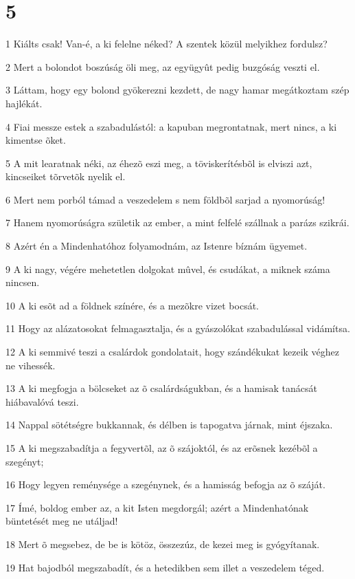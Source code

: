 \chapter{5}

\par 1 Kiálts csak! Van-é, a ki felelne néked? A szentek közül melyikhez fordulsz?
\par 2 Mert a bolondot boszúság öli meg, az együgyût pedig buzgóság veszti el.
\par 3 Láttam, hogy egy bolond gyökerezni kezdett, de nagy hamar megátkoztam szép hajlékát.
\par 4 Fiai messze estek a szabadulástól: a kapuban megrontatnak, mert nincs, a ki kimentse õket.
\par 5 A mit learatnak néki, az éhezõ eszi meg, a töviskerítésbõl is elviszi azt, kincseiket tõrvetõk nyelik el.
\par 6 Mert nem porból támad a veszedelem s nem földbõl sarjad a nyomorúság!
\par 7 Hanem nyomorúságra születik az ember, a mint felfelé szállnak a parázs szikrái.
\par 8 Azért én a Mindenhatóhoz folyamodnám, az Istenre bíznám ügyemet.
\par 9 A ki nagy, végére mehetetlen dolgokat mûvel, és csudákat, a miknek száma nincsen.
\par 10 A ki esõt ad a földnek színére, és a mezõkre vizet bocsát.
\par 11 Hogy az alázatosokat felmagasztalja, és a gyászolókat szabadulással vidámítsa.
\par 12 A ki semmivé teszi a csalárdok gondolatait, hogy szándékukat kezeik véghez ne vihessék.
\par 13 A ki megfogja a bölcseket az õ csalárdságukban, és a hamisak tanácsát hiábavalóvá teszi.
\par 14 Nappal sötétségre bukkannak, és délben is tapogatva járnak, mint éjszaka.
\par 15 A ki megszabadítja a fegyvertõl, az õ szájoktól, és az erõsnek kezébõl a szegényt;
\par 16 Hogy legyen reménysége a szegénynek, és a hamisság befogja az õ száját.
\par 17 Ímé, boldog ember az, a kit Isten megdorgál; azért a Mindenhatónak büntetését meg ne utáljad!
\par 18 Mert õ megsebez, de be is kötöz, összezúz, de kezei meg is gyógyítanak.
\par 19 Hat bajodból megszabadít, és a hetedikben sem illet a veszedelem téged.
